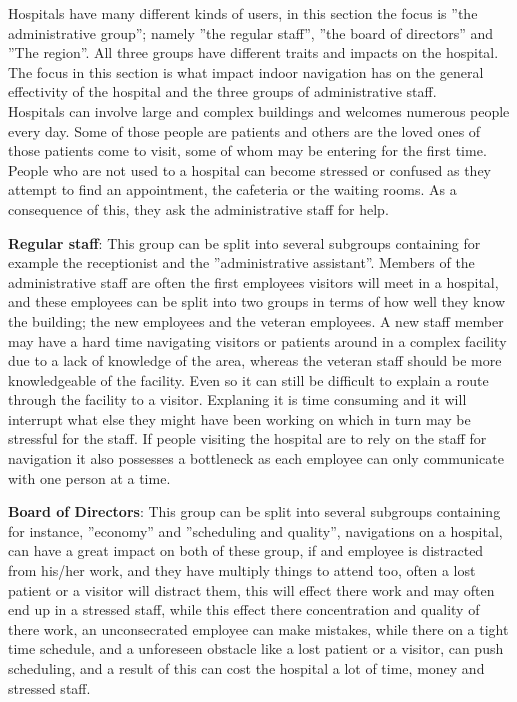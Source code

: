 Hospitals have many different kinds of users, in this section the focus is ''the administrative group''; namely ''the regular staff'', ''the board of directors'' and ''The region''. All three groups have different traits and impacts on the hospital. \\ The focus in this section is what impact indoor navigation has on the general effectivity of the hospital and the three groups of administrative staff.\\
Hospitals can involve large and complex buildings and welcomes numerous people every day. Some of those people are patients and others are the loved ones of those patients come to visit, some of whom may be entering for the first time. People who are not used to a hospital can become stressed or confused as they attempt to find an appointment, the cafeteria or the waiting rooms. As a consequence of this, they ask the administrative staff for help.

\textbf{Regular staff}: This group can be split into several subgroups containing for example the receptionist and the ''administrative assistant''. Members of the administrative staff are often the first employees visitors will meet in a hospital, and these employees can be split into two groups in terms of how well they know the building; the new employees and the veteran employees. A new staff member may have a hard time navigating visitors or patients around in a complex facility due to a lack of knowledge of the area, whereas the veteran staff should be more knowledgeable of the facility. Even so it can still be difficult to explain a route through the facility to a visitor. Explaning it is time consuming and it will interrupt what else they might have been working on which in turn may be stressful for the staff. If people visiting the hospital are to rely on the staff for navigation it also possesses a bottleneck as each employee can only communicate with one person at a time.

\textbf{Board of Directors}: This group can be split into several subgroups containing for instance, ''economy'' and ''scheduling and quality'', navigations on a hospital, can have a great impact on both  of these group, if and employee is distracted from his/her work, and they have multiply things to attend too, often a lost patient or a visitor will distract them, this will effect there work and may often end up in a stressed staff, while this effect there concentration and quality of there work, an unconsecrated employee can make mistakes, while there on a tight time schedule, and a unforeseen obstacle like a lost patient or a visitor, can push scheduling, and a result of this can cost the hospital a lot of time, money and stressed staff. 

